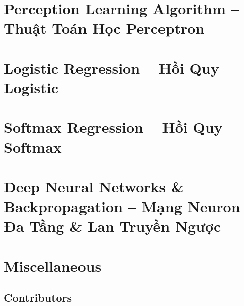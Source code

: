 \documentclass{article}
\begin{document}

\section{Perception Learning Algorithm -- Thuật Toán Học Perceptron}


\section{Logistic Regression -- Hồi Quy Logistic}


\section{Softmax Regression -- Hồi Quy Softmax}


\section{Deep Neural Networks \& Backpropagation -- Mạng Neuron Đa Tầng \& Lan Truyền Ngược}


\section{Miscellaneous}

\subsection{Contributors}


\printbibliography[heading=bibintoc]
	
\end{document}
